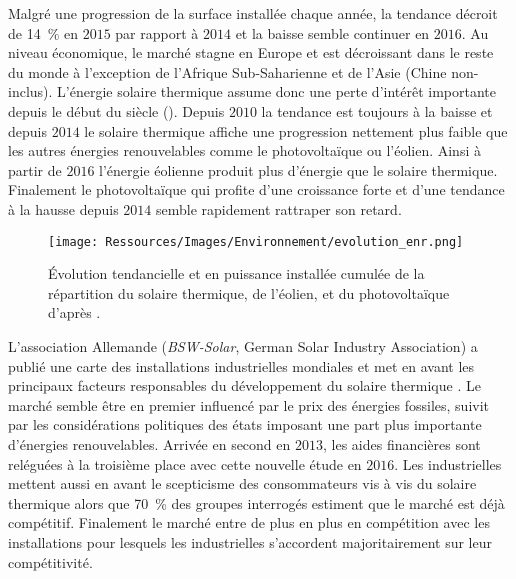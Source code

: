 Malgré une progression de la surface installée chaque année, la tendance décroit
de \SI{14}{\percent} en $2015$ par rapport à $2014$ et la baisse semble continuer en
$2016$. Au niveau économique, le marché stagne en Europe et est décroissant dans le reste
du monde à l’exception de l’Afrique Sub-Saharienne et de l’Asie (Chine non-inclus).
L’énergie solaire thermique assume donc une perte d’intérêt importante depuis le début du siècle
(). Depuis $2010$ la tendance est toujours à la baisse
et depuis $2014$ le solaire thermique affiche une progression nettement plus faible
que les autres énergies renouvelables comme le photovoltaïque ou l’éolien. Ainsi à partir
de $2016$ l’énergie éolienne produit plus d’énergie que le solaire thermique. Finalement
le photovoltaïque qui profite d’une croissance forte et d’une tendance à la hausse depuis $2014$
semble rapidement rattraper son retard.

\begin{figure}
    \centering
    \texttt{[image: Ressources/Images/Environnement/evolution\_enr.png]}
    \caption[Évolution tendancielle du solaire thermique, éolien, et photovoltaïque]
            {Évolution tendancielle et en puissance installée cumulée de la répartition
             du solaire thermique, de l’éolien, et du photovoltaïque d’après
             \textcite{Weiss2017}.}
    \label{fig:tendances_enr}
\end{figure}

L’association Allemande (\textit{BSW-Solar}, German Solar Industry Association)
a publié une carte des installations industrielles mondiales et met en avant les
principaux facteurs responsables du développement du solaire thermique \parencite{Augsten2017}.
Le  marché semble être en premier influencé par le prix des énergies fossiles, suivit par les considérations
politiques des états imposant une part plus importante d’énergies renouvelables. Arrivée
en second en $2013$, les aides financières sont reléguées à la troisième place avec
cette nouvelle étude en $2016$. Les industrielles
mettent aussi en avant le scepticisme des consommateurs vis à vis du solaire thermique
alors que \SI{70}{\percent} des groupes interrogés estiment que le marché est déjà
compétitif. Finalement le marché entre de plus en plus en compétition avec les installations  pour
lesquels les industrielles s’accordent majoritairement sur leur compétitivité.


